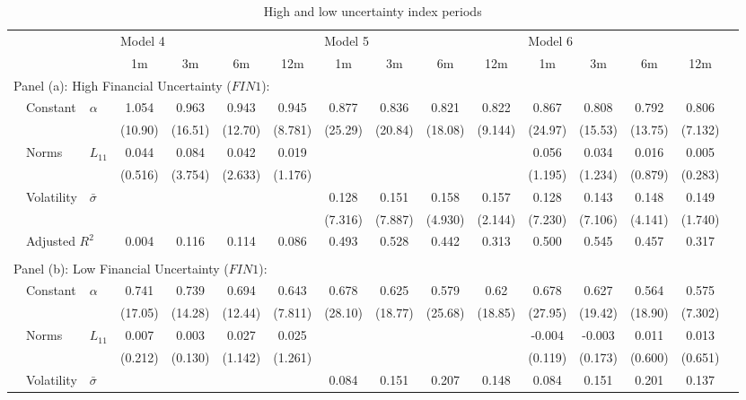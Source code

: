 \documentclass{article}
\begin{document}
\begin{sidewaystable}
    \begin{center}
        \caption{High and low uncertainty index periods}
        \label{tab:reg4hl}
        \begin{small}
        \begin{tabular}{ll l c c c c c c c c c c c c c}
        \hline
             &&& \multicolumn{4}{l}{Model 4} & \multicolumn{4}{l}{Model 5}& \multicolumn{4}{l}{Model 6}\\
             &&& 1m & 3m & 6m & 12m & 1m & 3m & 6m & 12m & 1m & 3m & 6m & 12m\\
             \hline
             \multicolumn{12}{l}{Panel (a): High Financial Uncertainty ($FIN1$): }\\
             & Constant & $\alpha$ & 1.054&0.963&0.943&0.945&0.877&0.836&0.821&0.822&0.867&0.808&0.792&0.806\\
             &&&(10.90)&(16.51)&(12.70)&(8.781)&(25.29)&(20.84)&(18.08)&(9.144)&(24.97)&(15.53)&(13.75)&(7.132)\\
             & Norms & $L_{11}$&0.044&0.084&0.042&0.019&&&&&0.056&0.034&0.016&0.005\\
             &&&(0.516)&(3.754)&(2.633)&(1.176)&&&&&(1.195)&(1.234)&(0.879)&(0.283)\\
             & Volatility & $\bar{\sigma}$&&&&&0.128&0.151&0.158&0.157&0.128&0.143&0.148&0.149\\
             &&&&&&&(7.316)&(7.887)&(4.930)&(2.144)&(7.230)&(7.106)&(4.141)&(1.740)\\
             & \multicolumn{2}{l}{Adjusted $R^2$} & 0.004&0.116&0.114&0.086&0.493&0.528&0.442&0.313&0.500&0.545&0.457&0.317\\
             &&&&&&&\\
             \multicolumn{12}{l}{Panel (b): Low Financial Uncertainty ($FIN1$): }\\
             & Constant & $\alpha$ & 0.741&0.739&0.694&0.643&0.678&0.625&0.579&0.62&0.678&0.627&0.564&0.575\\
             &&&(17.05)&(14.28)&(12.44)&(7.811)&(28.10)&(18.77)&(25.68)&(18.85)&(27.95)&(19.42)&(18.90)&(7.302)\\
             & Norms & $L_{11}$&0.007&0.003&0.027&0.025&&&&&-0.004&-0.003&0.011&0.013\\
             &&&(0.212)&(0.130)&(1.142)&(1.261)&&&&&(0.119)&(0.173)&(0.600)&(0.651)\\
             & Volatility & $\bar{\sigma}$&&&&&0.084&0.151&0.207&0.148&0.084&0.151&0.201&0.137\\

\end{tabular}
\end{small}
\end{center}
\end{sidewaystable}
\end{document}
